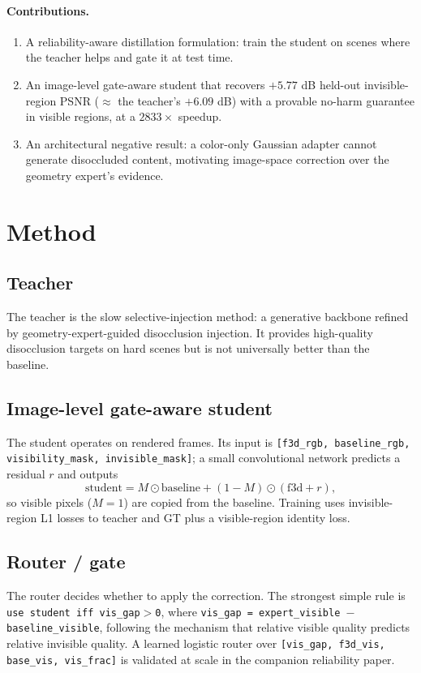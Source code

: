 \documentclass[10pt,twocolumn,letterpaper]{article}
\begin{document}
\paragraph{Contributions.}
\begin{enumerate}
\item A reliability-aware distillation formulation: train the student on scenes
where the teacher helps and gate it at test time.
\item An image-level gate-aware student that recovers $+5.77$ dB held-out
invisible-region PSNR ($\approx$ the teacher's $+6.09$ dB) with a provable
no-harm guarantee in visible regions, at a $2833\times$ speedup.
\item An architectural negative result: a color-only Gaussian adapter cannot
generate disoccluded content, motivating image-space correction over the
geometry expert's evidence.
\end{enumerate}

\section{Method}
\label{sec:method}
\subsection{Teacher}
The teacher is the slow selective-injection method: a generative backbone refined
by geometry-expert-guided disocclusion injection. It provides high-quality
disocclusion targets on hard scenes but is not universally better than the
baseline.

\subsection{Image-level gate-aware student}
The student operates on rendered frames. Its input is
\texttt{[f3d\_rgb, baseline\_rgb, visibility\_mask, invisible\_mask]}; a small
convolutional network predicts a residual $r$ and outputs
\[
\text{student} = M\odot\text{baseline} + (1-M)\odot(\text{f3d}+r),
\]
so visible pixels ($M{=}1$) are copied from the baseline. Training uses
invisible-region L1 losses to teacher and GT plus a visible-region identity loss.

\subsection{Router / gate}
The router decides whether to apply the correction. The strongest simple rule is
\texttt{use student iff vis\_gap$>$0}, where
\texttt{vis\_gap = expert\_visible $-$ baseline\_visible}, following the mechanism
that relative visible quality predicts relative invisible quality. A learned
logistic router over \texttt{[vis\_gap, f3d\_vis, base\_vis, vis\_frac]} is
validated at scale in the companion reliability paper.
\end{document}
